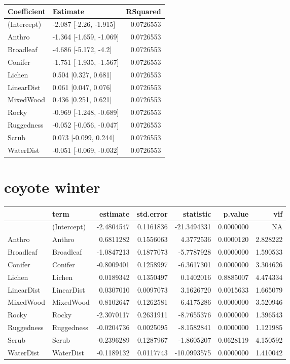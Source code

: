\documentclass[]{article}
\begin{document}
\begin{tabular}{llr}
\toprule
Coefficient & Estimate & RSquared\\
\midrule
(Intercept) & -2.087 [-2.26, -1.915] & 0.0726553\\
Anthro & -1.364 [-1.659, -1.069] & 0.0726553\\
Broadleaf & -4.686 [-5.172, -4.2] & 0.0726553\\
Conifer & -1.751 [-1.935, -1.567] & 0.0726553\\
Lichen & 0.504 [0.327, 0.681] & 0.0726553\\
LinearDist & 0.061 [0.047, 0.076] & 0.0726553\\
MixedWood & 0.436 [0.251, 0.621] & 0.0726553\\
Rocky & -0.969 [-1.248, -0.689] & 0.0726553\\
Ruggedness & -0.052 [-0.056, -0.047] & 0.0726553\\
Scrub & 0.073 [-0.099, 0.244] & 0.0726553\\
WaterDist & -0.051 [-0.069, -0.032] & 0.0726553\\
\bottomrule
\end{tabular}

\section{coyote winter}\label{coyote-winter}

\begin{tabular}{llrrrrr}
\toprule
  & term & estimate & std.error & statistic & p.value & vif\\
\midrule
 & (Intercept) & -2.4804547 & 0.1161836 & -21.3494331 & 0.0000000 & NA\\
Anthro & Anthro & 0.6811282 & 0.1556063 & 4.3772536 & 0.0000120 & 2.828222\\
Broadleaf & Broadleaf & -1.0847213 & 0.1877073 & -5.7787928 & 0.0000000 & 1.590533\\
Conifer & Conifer & -0.8009401 & 0.1258997 & -6.3617301 & 0.0000000 & 3.304626\\
Lichen & Lichen & 0.0189342 & 0.1350497 & 0.1402016 & 0.8885007 & 4.474334\\
LinearDist & LinearDist & 0.0307010 & 0.0097073 & 3.1626720 & 0.0015633 & 1.665079\\
MixedWood & MixedWood & 0.8102647 & 0.1262581 & 6.4175286 & 0.0000000 & 3.520946\\
Rocky & Rocky & -2.3070117 & 0.2631911 & -8.7655376 & 0.0000000 & 1.396543\\
Ruggedness & Ruggedness & -0.0204736 & 0.0025095 & -8.1582841 & 0.0000000 & 1.121985\\
Scrub & Scrub & -0.2396289 & 0.1287967 & -1.8605207 & 0.0628119 & 4.150592\\
WaterDist & WaterDist & -0.1189132 & 0.0117743 & -10.0993575 & 0.0000000 & 1.410042\\
\bottomrule
\end{tabular}
\end{document}
